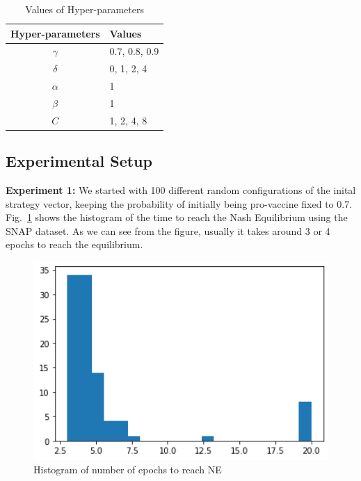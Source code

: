 \begin{table}[H]
\centering
\caption{Values of Hyper-parameters}
\label{table:hyper-params}
\begingroup
\setlength{\tabcolsep}{4pt}
\renewcommand{\arraystretch}{1.35}
\begin{tabular}{|c|l|}
\hline
Hyper-parameters          & Values\\ \hline
$\gamma$ & 0.7, 0.8, 0.9\\ \hline
$\delta$         & 0, 1, 2, 4\\ \hline
$\alpha$         & 1\\ \hline
$\beta$   & 1\\ \hline
$C$      & 1, 2, 4, 8~\cite{cvalue}\\ \hline
\end{tabular}
\endgroup
\end{table}

\subsection{Experimental Setup}






\noindent
\textbf{Experiment 1:} We started with 100 different random configurations of the inital strategy vector, keeping the probability of initially being pro-vaccine fixed to 0.7. Fig.~\ref{fig:convergence_hist} shows the histogram of the time to reach the Nash Equilibrium using the SNAP dataset. As we can see from the figure, usually it takes around 3 or 4 epochs to reach the equilibrium. 

\begin{figure}[H]
    \centering
    \includegraphics[width=12cm]{figs/convergence_hist.png}
    \caption{Histogram of number of epochs to reach NE}
    \label{fig:convergence_hist}
\end{figure}


